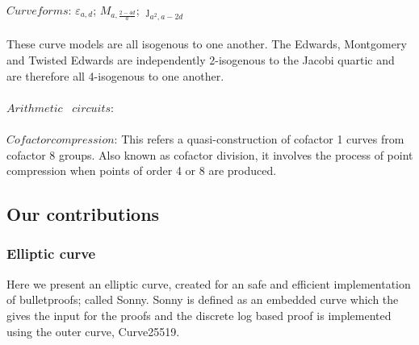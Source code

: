 \documentclass{article}
\begin{document}
$Curve forms$: $\varepsilon_{a,d}$; ${M}_{a,\frac{2-4d}{a}}$; $\jmath_{a^{2},a-{2d}}$ \\\\ These curve models are all isogenous to one another. The Edwards, Montgomery and Twisted Edwards are independently 2-isogenous to the Jacobi quartic and are therefore all 4-isogenous to one another.  \\\\
$Arithmetic$ \ $circuits$: \\\\
$Cofactor compression$: This refers a quasi-construction of cofactor 1 curves from cofactor 8 groups. Also known as cofactor division, it involves the process of point compression when points of order 4 or 8 are produced.\\ 

\subsection{Our contributions}
\subsubsection{Elliptic curve}
Here we present an elliptic curve, created for an safe and efficient implementation of bulletproofs; called Sonny. Sonny is defined as an embedded curve which the gives the input for the proofs and the discrete log based proof is implemented using the outer curve, Curve25519. \\\\
\end{document}
